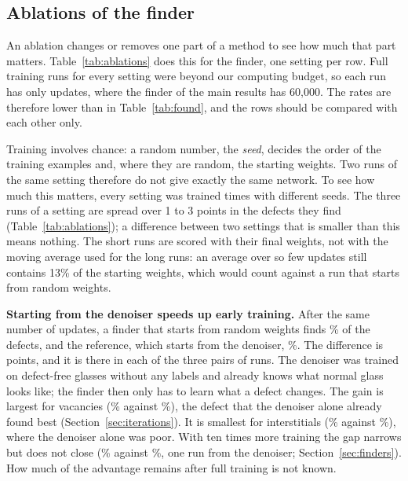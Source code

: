 \subsection{Ablations of the finder}
\label{sec:ablations}



An ablation changes or removes one part of a method to see how much that part matters. Table~\ref{tab:ablations} does this for the finder, one setting per row. Full training runs for every setting were beyond our computing budget, so each run has only  updates, where the finder of the main results has 60,000. The rates are therefore lower than in Table~\ref{tab:found}, and the rows should be compared with each other only.

Training involves chance: a random number, the \emph{seed}, decides the order of the training examples and, where they are random, the starting weights. Two runs of the same setting therefore do not give exactly the same network. To see how much this matters, every setting was trained  times with different seeds. The three runs of a setting are spread over 1 to 3 points in the defects they find (Table~\ref{tab:ablations}); a difference between two settings that is smaller than this means nothing. The short runs are scored with their final weights, not with the moving average used for the long runs: an average over so few updates still contains 13\% of the starting weights, which would count against a run that starts from random weights.

\textbf{Starting from the denoiser speeds up early training.} After the same number of updates, a finder that starts from random weights finds \% of the defects, and the reference, which starts from the denoiser, \%. The difference is  points, and it is there in each of the three pairs of runs. The denoiser was trained on defect-free glasses without any labels and already knows what normal glass looks like; the finder then only has to learn what a defect changes. The gain is largest for vacancies (\% against \%), the defect that the denoiser alone already found best (Section~\ref{sec:iterations}). It is smallest for interstitials (\% against \%), where the denoiser alone was poor. With ten times more training the gap narrows but does not close (\% against \%, one run from the denoiser; Section~\ref{sec:finders}). How much of the advantage remains after full training is not known.

